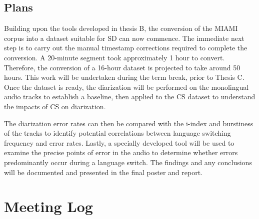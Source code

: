 \documentclass[11pt, a4paper]{report}
\begin{document}

\subsection*{Plans}
Building upon the tools developed in thesis B, the conversion of the MIAMI 
corpus into a dataset suitable for SD can now commence. The immediate next 
step is to carry out the manual timestamp corrections required to complete 
the conversion. A 20-minute segment took approximately 1 hour to convert.
Therefore, the conversion of a 16-hour dataset is projected to take around 
50 hours. This work will be undertaken during the term break, prior to 
Thesis C. Once the dataset is ready, the diarization will be performed 
on the monolingual audio tracks to establish a baseline, then applied to 
the CS dataset to understand the impacts of CS on diarization.

\vspace*{10pt}
The diarization error rates can then be compared with the i-index and 
burstiness of the tracks to identify potential correlations between 
language switching frequency and error rates. Lastly, a specially developed
tool will be used to examine the precise points of error in the audio to
determine whether errors predominantly occur during a language switch.
The findings and any conclusions will be documented and presented in the final 
poster and report.



\newpage
\section*{Meeting Log}


\end{document}
